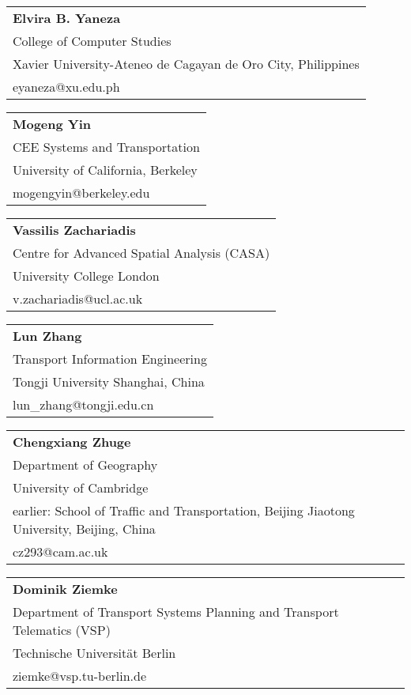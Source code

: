 \begin{tabular}[width=0.48\textwidth]{@{}l}
\textbf{Elvira B. Yaneza} \\
College of Computer Studies \\
Xavier University-Ateneo de Cagayan de Oro City, Philippines \\
eyaneza@xu.edu.ph  \\
\end{tabular}

\begin{tabular}[width=0.48\textwidth]{@{}l}
\textbf{Mogeng Yin} \\
CEE Systems and Transportation \\
University of California, Berkeley \\
mogengyin@berkeley.edu \\
\end{tabular}

\begin{tabular}[width=0.48\textwidth]{@{}l}
\textbf{Vassilis Zachariadis} \\
Centre for Advanced Spatial Analysis (CASA) \\
University College London \\
v.zachariadis@ucl.ac.uk \\
\end{tabular}

\begin{tabular}[width=0.48\textwidth]{@{}l}
\textbf{Lun Zhang} \\
Transport Information Engineering \\
Tongji University Shanghai, China \\
lun\_zhang@tongji.edu.cn \\
\end{tabular}

\begin{tabular}[width=0.48\textwidth]{@{}l}
\textbf{Chengxiang Zhuge} \\
Department of Geography \\
University of Cambridge\\
earlier: School of Traffic and Transportation, Beijing Jiaotong University, Beijing, China \\
cz293@cam.ac.uk \\
\end{tabular}

\begin{tabular}[width=0.48\textwidth]{@{}l}
\textbf{Dominik Ziemke} \\
Department of Transport Systems Planning and Transport Telematics (VSP) \\
Technische Universität Berlin \\
ziemke@vsp.tu-berlin.de \\
\end{tabular}

